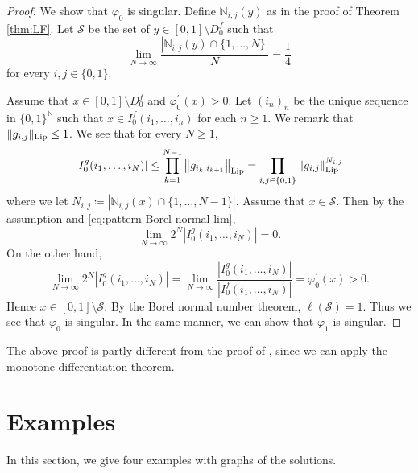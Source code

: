 \documentclass[a4paper, reqno, 11pt]{amsart}
\theoremstyle{definition}
\begin{document}
\begin{proof}
We show that $\varphi_0$ is singular. 
Define $\mathbb{N}_{i,j}(y)$ as in the proof of Theorem \ref{thm:LF}. 
Let $\mathcal{S}$ be the set of $y \in [0,1] \setminus  D^f_0$ such that 
\begin{equation}\label{eq:pattern-Borel-normal-lim}
\lim_{N \to \infty} \frac{\left|\mathbb{N}_{i,j}(y) \cap \{1, \dots, N\}\right|}{N} = \frac{1}{4}
\end{equation}
for every $i, j \in \{0,1\}$. 


Assume that $x\in [0,1] \setminus D^{f}_0$ and $\varphi_0^{\prime}(x) > 0$.
Let $(i_n)_n$ be the unique sequence in $\{0,1\}^{\mathbb N}$ such that $x \in I^{f}_{0} (i_1, \dots, i_n)$ for each $n \ge 1$. 
We remark that $\| g_{i,j} \|_{\textup{Lip}} \le 1$. 
We see that for every $N \ge 1$, 
\[ \left|I^{g}_{0} (i_1, \dots, i_N)\right| \le \prod_{k=1}^{N-1} \left\| g_{i_k, i_{k+1}} \right\|_{\textup{Lip}} = \prod_{i,j \in \{0,1\}} \left\| g_{i,j} \right\|_{\textup{Lip}}^{N_{i,j}} \]
where we let $N_{i,j} \coloneqq \left|\mathbb{N}_{i,j}(x) \cap \{1, \dots, N-1\}\right|$. 
Assume that $x \in \mathcal{S}$. 
Then by the assumption and \eqref{eq:pattern-Borel-normal-lim}, 
\[ \lim_{N \to \infty} 2^N  \left|I^{g}_{0} (i_1, \dots, i_N)\right| = 0. \]
On the other hand, 
\[ \lim_{N \to \infty} 2^N  \left|I^{g}_{0} (i_1, \dots, i_N)\right| = \lim_{N \to \infty} \frac{|I^{g}_{0} (i_1, \dots, i_N)|}{|I^{f}_{0} (i_1, \dots, i_N)|}   = \varphi_0^{\prime}(x)  > 0. \]
Hence $x \in [0,1] \setminus  \mathcal{S}$. 
By the Borel normal number theorem, $\ell(\mathcal{S}) = 1$. 
Thus we see that $\varphi_0$ is singular. 
In the same manner, we can show that $\varphi_1$ is singular. 
\end{proof}

The above proof is partly different from the proof of \cite[Theorem 7.3]{Hata1985}, since we can apply the monotone differentiation theorem. 

\section{Examples}\label{sec:exa}

In this section, we give four examples with graphs of the solutions. 
\end{document}
